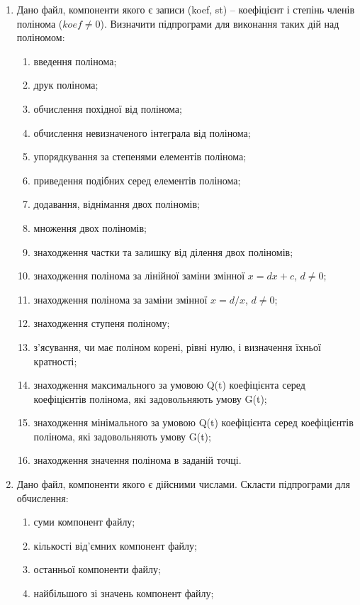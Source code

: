 \documentclass[]{article}
\makeatletter
\newcommand{\xslalph}[1]{\expandafter\@xslalph\csname c@#1\endcsname}
\newcommand{\@xslalph}[1]{%
    \ifcase#1\or а\or б\or в\or г\or д\or e\or є\or ж\or з\or i%
    \or й\or к\or л\or м\or н\or о\or п\or р\or с\or т%
    \or у\or ф\or х\or ц\or ч\or ш\or ю\or я\or аа\or бб\or вв %
    \else\@ctrerr\fi%
}
\makeatother
\begin{document}
\begin{enumerate}
\item
Дано файл, компоненти якого є записи (koef, st) -- коефіцієнт і
степінь членів полінома ($koef \neq 0$). Визначити підпрограми для виконання
таких дій над поліномом:
\begin{enumerate}[label=\xslalph*)]
\item
 введення полінома;
\item
 друк полінома;
\item обчислення похідної від полінома;
\item обчислення невизначеного інтеграла від полінома;
\item упорядкування за степенями елементів полінома;
\item приведення подібних серед елементів полінома;
\item додавання, віднімання двох поліномів;
\item множення двох поліномів;
\item знаходження частки та залишку від ділення двох поліномів;
\item знаходження полінома за лінійної заміни змінної $x = dx + c$, $d \neq 0$;
\item знаходження полінома за заміни змінної $x = d/x$, $d \neq 0$;
\item знаходження ступеня поліному;
\item з'ясування, чи має поліном корені, рівні нулю, і визначення їхньої
кратності;
\item знаходження максимального за умовою Q(t) коефіцієнта серед
коефіцієнтів полінома, які задовольняють умову G(t);
\item знаходження мінімального за умовою Q(t) коефіцієнта серед
коефіцієнтів полінома, які задовольняють умову G(t);
\item знаходження значення полінома в заданій точці.
\end{enumerate}

\item
Дано файл, компоненти якого є
дійсними числами. Скласти підпрограми для обчислення:
\begin{enumerate}[label=\xslalph*)]
\item суми компонент файлу;

\item кількості від'ємних компонент файлу;

\item останньої компоненти файлу;

\item найбільшого зі значень компонент файлу;


\end{enumerate}
\end{enumerate}
\end{document}
